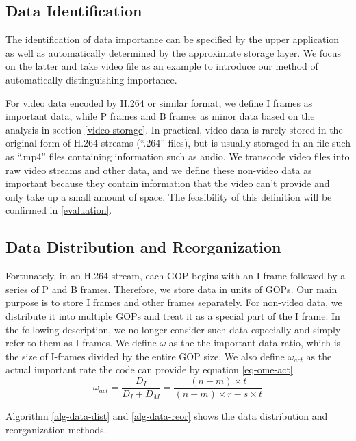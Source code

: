 \documentclass[sigconf]{acmart}
\begin{document}
\subsection{Data Identification}
The identification of data importance can be specified by the upper application as well as automatically determined by the approximate storage layer. We focus on the latter and take video file as an example to introduce our method of automatically distinguishing importance.

For video data encoded by H.264 or similar format, we define I frames as important data, while P frames and B frames as minor data based on the analysis in section \ref{video storage}. In practical, video data is rarely stored in the original form of H.264 streams (``.264'' files), but is usually storaged in an file such as ``.mp4'' files containing information such as audio. We transcode video files into raw video streams and other data, and we define these non-video data as important because they contain information that the video can't provide and only take up a small amount of space. The feasibility of this definition will be confirmed in \ref{evaluation}.

\subsection{Data Distribution and Reorganization}
Fortunately, in an H.264 stream, each GOP begins with an I frame followed by a series of P and B frames. Therefore, we store data in units of GOPs. Our main purpose is to store I frames and other frames separately. For non-video data, we distribute it into multiple GOPs and treat it as a special part of the I frame. In the following description, we no longer consider such data especially and simply refer to them as I-frames.
We define $\omega$ as the the important data ratio, which is the size of I-frames divided by the entire GOP size. We also define $\omega_{act}$ as the actual important rate the code can provide by equation \ref{eq-ome-act}.
\begin{equation}\label{eq-ome-act}
    \omega_{act}=\frac{D_I}{D_I+D_M}=\frac{(n-m) \times t}{(n-m) \times r-s \times t}
\end{equation}

  Algorithm \ref{alg-data-dist} and \ref{alg-data-reor} shows the data distribution and reorganization methods.
\end{document}
